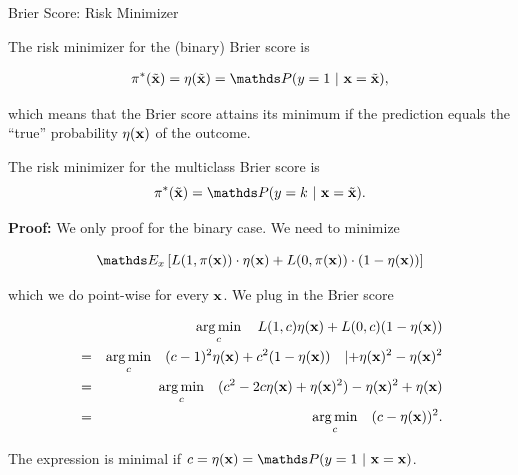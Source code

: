 \documentclass[11pt,compress,t,notes=noshow, xcolor=table]{beamer}
\begin{document}
\begin{vbframe}{Brier Score: Risk Minimizer}

The risk minimizer for the (binary) Brier score is 

\begin{eqnarray*}
\piastxtil = \eta(\xtil) = \P(y=1~|~\xv = \xtil),
\end{eqnarray*}

which means that the Brier score attains its minimum if the prediction equals the \enquote{true} probability $\eta(\mathbf{x})$ of the outcome. 

\lz 

The risk minimizer for the multiclass Brier score is 
$$\piastxtil = \P(y = k ~|~ \xv = \xtil). $$
 
\framebreak
\textbf{Proof: } We only proof for the binary case. We need to minimize 

$$
\E_x \left[L(1, \pix) \cdot \eta(\xv) + L(0, \pix) \cdot (1 - \eta(\xv)) \right]
$$

which we do point-wise for every $\mathbf{x}$. We plug in the Brier score

\vspace*{-0.3cm}

\begin{eqnarray*}
	&& \mathop{\mathrm{arg\,min}}_c \quad L(1, c) \eta(\mathbf{x}) + L(0, c) (1 - \eta(\mathbf{x})) \\ 
	&=&  \mathop{\mathrm{arg\,min}}_c \quad (c - 1)^2 \eta(\mathbf{x}) + c^2 (1 - \eta(\mathbf{x}))  \quad |{+\eta(\mathbf{x})^2-\eta(\mathbf{x})^2}\\
  &=&  \mathop{\mathrm{arg\,min}}_c \quad (c^2 -2c\eta(\mathbf{x}) + \eta(\mathbf{x})^2)- \eta(\mathbf{x})^2 + \eta(\mathbf{x}) \\
	&=&  \mathop{\mathrm{arg\,min}}_c \quad (c - \eta(\mathbf{x}))^2.
\end{eqnarray*}

The expression is minimal if $c = \eta(\xv) = \P(y = 1~|~\xv = \xv)$.

\end{vbframe}
\end{document}
